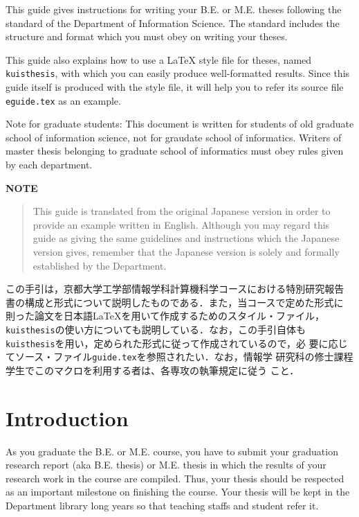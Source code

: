 \documentclass[master,english]{kuisthesis}
\date{February 12th, 2019}
\begin{document}
\maketitle					%

\begin{eabstract}				%
This guide gives instructions for writing your B.E. or M.E. theses following
the standard of the Department of Information Science.  The
standard includes the structure and format which you must obey on writing
your theses.

This guide also explains how to use a \LaTeX{} style file for theses, named
\verb|kuisthesis|, with which you can easily produce well-formatted results.
Since this guide itself is produced with the style file, it will help you to
refer its source file \verb|eguide.tex| as an example.

Note for graduate students: This document is written for students of
old graduate school of information science, not for graudate school of
informatics. Writers of master thesis belonging to graduate school
of informatics must obey rules given by each department.

\par\bigskip\centerline{\bf NOTE}
\begin{quote}
  This guide is translated from the original Japanese version in order
  to provide an example written in English.  Although you may regard
  this guide as giving the same guidelines and instructions which the
  Japanese version gives, remember that the Japanese version is solely
  and formally established by the Department.
\end{quote}
\end{eabstract}

\begin{jabstract}				%
この手引は，京都大学工学部情報学科計算機科学コースにおける特別研究報告
書の構成と形式について説明したものである．また，当コースで定めた形式に
則った論文を日本語\LaTeX を用いて作成するためのスタイル・ファイル，
\verb|kuisthesis|の使い方についても説明している．なお，この手引自体も
\verb|kuisthesis|を用い，定められた形式に従って作成されているので，必
要に応じてソース・ファイル\verb|guide.tex|を参照されたい．なお，情報学
研究科の修士課程学生でこのマクロを利用する者は、各専攻の執筆規定に従う
こと．
\end{jabstract}

\tableofcontents				%

\section{Introduction}\label{sec-intro}		%
As you graduate the B.E. or M.E. course, you have to submit your graduation
research report (aka B.E. thesis) or M.E. thesis in which the results of
your research work in the course are compiled.  Thus, your thesis should be
respected as an important milestone on finishing the course.  Your thesis
will be kept in the Department library long years so that teaching staffs
and student refer it.
\end{document}
